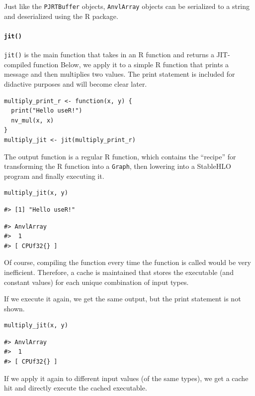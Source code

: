 Just like the \texttt{PJRTBuffer} objects, \texttt{AnvlArray} objects can be serialized to a string and deserialized using the  R package.

\paragraph{\texorpdfstring{\texttt{jit()}}{jit()}}\label{jit}

\texttt{jit()} is the main function that takes in an R function and returns a JIT-compiled function
Below, we apply it to a simple R function that prints a message and then multiplies two values.
The print statement is included for didactive purposes and will become clear later.

\begin{verbatim}
multiply_print_r <- function(x, y) {
  print("Hello useR!")
  nv_mul(x, x)
}
multiply_jit <- jit(multiply_print_r)
\end{verbatim}

The output function is a regular R function, which contains the ``recipe'' for transforming the R function into a \texttt{Graph}, then lowering into a StableHLO program and finally executing it.

\begin{verbatim}
multiply_jit(x, y)
\end{verbatim}

\begin{verbatim}
#> [1] "Hello useR!"
\end{verbatim}

\begin{verbatim}
#> AnvlArray
#>  1
#> [ CPUf32{} ]
\end{verbatim}

Of course, compiling the function every time the function is called would be very inefficient.
Therefore, a cache is maintained that stores the executable (and constant values) for each unique combination of input types.

If we execute it again, we get the same output, but the print statement is not shown.

\begin{verbatim}
multiply_jit(x, y)
\end{verbatim}

\begin{verbatim}
#> AnvlArray
#>  1
#> [ CPUf32{} ]
\end{verbatim}

If we apply it again to different input values (of the same types), we get a cache hit and directly execute the cached executable.

